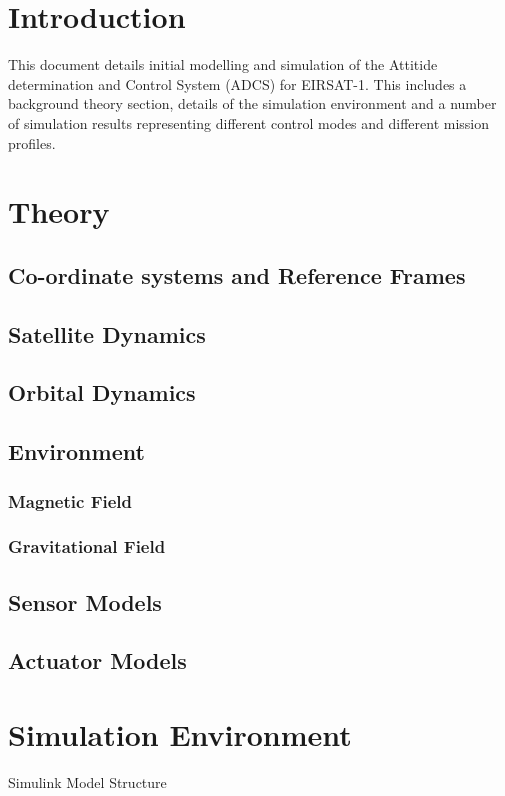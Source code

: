 
\section{Introduction}
This document details initial modelling and simulation of the Attitide determination and Control System (ADCS) for EIRSAT-1.
This includes a background theory section, details of the simulation environment and a number of simulation results representing different control modes and different mission profiles.

\section{Theory}
\subsection{Co-ordinate systems and Reference Frames}

\subsection{Satellite Dynamics}

\subsection{Orbital Dynamics}

\subsection{Environment}
\subsubsection{Magnetic Field}
\subsubsection{Gravitational Field}

\subsection{Sensor Models}

\subsection{Actuator Models}

\section{Simulation Environment}
Simulink Model Structure

